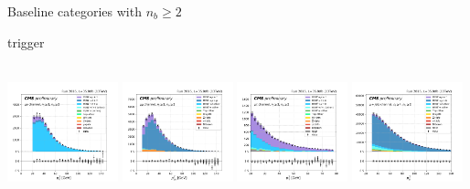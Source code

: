 \begin{frame}{}
    Baseline categories with $n_b\geq2$
    \begin{block}{\smaller \PGm trigger}
    \begin{center}
        \cme \qquad\qquad\qquad\quad \cmm \qquad\qquad\qquad\quad \cmt \qquad\qquad\qquad\quad \cmh \\
        \includegraphics[width=0.24\textwidth]{chapters/Analysis/sectionPlots/figures/kinematics_pickles/emu/2b/emu_2b_lepton2_pt.pdf}
        \includegraphics[width=0.24\textwidth]{chapters/Analysis/sectionPlots/figures/kinematics_pickles/mumu/2b/mumu_2b_lepton2_pt.pdf}
        \includegraphics[width=0.24\textwidth]{chapters/Analysis/sectionPlots/figures/kinematics_pickles/mutau/2b/mutau_2b_lepton2_pt.pdf}
        \includegraphics[width=0.24\textwidth]{chapters/Analysis/sectionPlots/figures/kinematics_pickles/mu4j/2b/mu4j_2b_lepton1_pt.pdf}
    \end{center}
    \end{block}
    

\end{frame}

